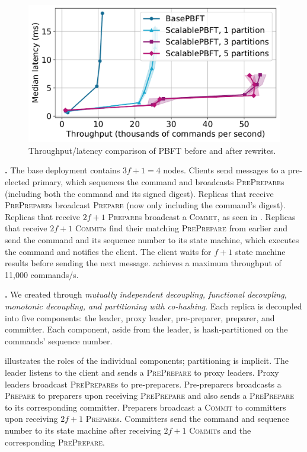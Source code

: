 \begin{figure}[t]
    \centering
    \includegraphics[width=0.6\linewidth]{assets/pbft_lt.pdf}
    \caption{Throughput/latency comparison of PBFT before and after rewrites.}
    \label{fig:throughput}
\end{figure}

\textbf{\BasePBFT{}.}
The base deployment contains $3f+1 = 4$ nodes.
Clients send messages to a pre-elected primary, which sequences the command and broadcasts \textsc{PrePrepare}s (including both the command and its signed digest).
Replicas that receive \textsc{PrePrepare}s broadcast \textsc{Prepare} (now only including the command's digest).
Replicas that receive $2f+1$ \textsc{Prepare}s broadcast a \textsc{Commit}, as seen in .
Replicas that receive $2f+1$ \textsc{Commit}s find their matching \textsc{PrePrepare} from earlier and send the command and its sequence number to its state machine, which executes the command and notifies the client.
The client waits for $f+1$ state machine results before sending the next message.
\BasePBFT{} achieves a maximum throughput of 11,000 commands/s.


\textbf{\ScalablePBFT{}.}
We created \ScalablePBFT{} through \textit{mutually independent decoupling, functional decoupling, monotonic decoupling, and partitioning with co-hashing}.
Each replica is decoupled into five components: the leader, proxy leader, pre-preparer, preparer, and committer.
Each component, aside from the leader, is hash-partitioned on the commands' sequence number.

 illustrates the roles of the individual components; partitioning is implicit.
The leader listens to the client and sends a \textsc{PrePrepare} to proxy leaders.
Proxy leaders broadcast \textsc{PrePrepare}s to pre-preparers.
Pre-preparers broadcasts a \textsc{Prepare} to preparers upon receiving \textsc{PrePrepare} and also sends a \textsc{PrePrepare} to its corresponding committer.
Preparers broadcast a \textsc{Commit} to committers upon receiving $2f+1$ \textsc{Prepare}s.
Committers send the command and sequence number to its state machine after receiving $2f+1$ \textsc{Commit}s and the corresponding \textsc{PrePrepare}.

